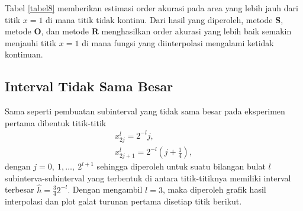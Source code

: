     \begin{table}[htp]
        \centering
        \caption{Tabel estimasi order akurasi eksperimen kedua dengan interval sama besar $h=2^{-l}$, $5 \leq l \leq 8$, $W=\{ i : 1\leq i \leq l_0 $ atau $l_1 \leq i \leq 2^{l+1}- 1\}$, $l_0 = 2^l - 2l - 1$ dan $l_1 =  2^l + 2l + 2$}
        \label{tabel8}
    \end{table}

    Tabel \ref{tabel8} memberikan estimasi order akurasi pada area yang lebih jauh dari titik $x=1$ di mana titik tidak kontinu. Dari hasil yang diperoleh, metode $\textbf{S}$, metode $\textbf{O}$, dan metode $\textbf{R}$ menghasilkan order akurasi yang lebih baik semakin menjauhi titik $x=1$ di mana fungsi yang diinterpolasi mengalami ketidak kontinuan.
    
\subsection{Interval Tidak Sama Besar}

Sama seperti pembuatan subinterval yang tidak sama besar pada eksperimen pertama dibentuk titik-titik
\begin{align*}
    x_{2j}^l = 2^{-l}j,\\
    x_{2j + 1}^l = 2^{-l}\left(j + \frac{1}{4}\right),
\end{align*}
dengan $j = 0,~1,\dots,~2^{l+1}$ sehingga diperoleh untuk suatu bilangan bulat $l$ subinterva-subinterval yang terbentuk di antara titik-titiknya memiliki interval terbesar \mbox{$\hat{h} = \frac{3}{4}2^{-l}.$} Dengan mengambil $l=3$, maka diperoleh grafik hasil interpolasi dan plot galat turunan pertama disetiap titik berikut.

